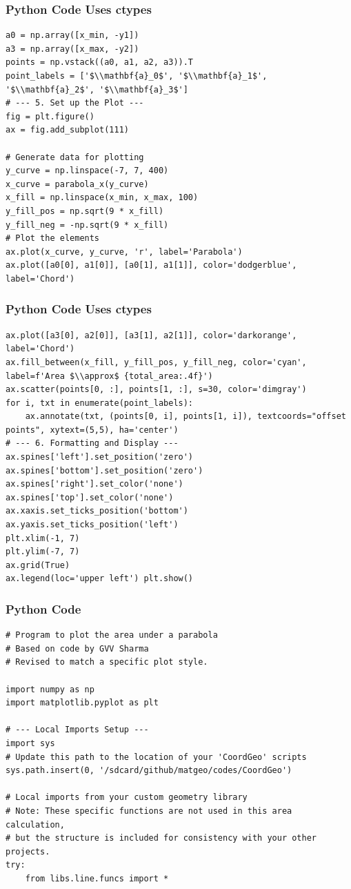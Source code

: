 \documentclass{beamer}
\begin{document}
\begin{frame}[fragile]
\frametitle{Python Code Uses ctypes}
\begin{lstlisting}
a0 = np.array([x_min, -y1])
a3 = np.array([x_max, -y2])
points = np.vstack((a0, a1, a2, a3)).T
point_labels = ['$\\mathbf{a}_0$', '$\\mathbf{a}_1$', '$\\mathbf{a}_2$', '$\\mathbf{a}_3$']
# --- 5. Set up the Plot ---
fig = plt.figure()
ax = fig.add_subplot(111)

# Generate data for plotting
y_curve = np.linspace(-7, 7, 400)
x_curve = parabola_x(y_curve)
x_fill = np.linspace(x_min, x_max, 100)
y_fill_pos = np.sqrt(9 * x_fill)
y_fill_neg = -np.sqrt(9 * x_fill)
# Plot the elements
ax.plot(x_curve, y_curve, 'r', label='Parabola')
ax.plot([a0[0], a1[0]], [a0[1], a1[1]], color='dodgerblue', label='Chord')
 \end{lstlisting}
 \end{frame}
\begin{frame}[fragile]
\frametitle{Python Code Uses ctypes}
\begin{lstlisting}
ax.plot([a3[0], a2[0]], [a3[1], a2[1]], color='darkorange', label='Chord')
ax.fill_between(x_fill, y_fill_pos, y_fill_neg, color='cyan', label=f'Area $\\approx$ {total_area:.4f}')
ax.scatter(points[0, :], points[1, :], s=30, color='dimgray')
for i, txt in enumerate(point_labels):
    ax.annotate(txt, (points[0, i], points[1, i]), textcoords="offset points", xytext=(5,5), ha='center')
# --- 6. Formatting and Display ---
ax.spines['left'].set_position('zero')
ax.spines['bottom'].set_position('zero')
ax.spines['right'].set_color('none')
ax.spines['top'].set_color('none')
ax.xaxis.set_ticks_position('bottom')
ax.yaxis.set_ticks_position('left')
plt.xlim(-1, 7)
plt.ylim(-7, 7)
ax.grid(True)
ax.legend(loc='upper left') plt.show()
 \end{lstlisting}
 \end{frame}
\begin{frame}[fragile]
\frametitle{Python Code}
\begin{lstlisting}
# Program to plot the area under a parabola
# Based on code by GVV Sharma
# Revised to match a specific plot style.

import numpy as np
import matplotlib.pyplot as plt

# --- Local Imports Setup ---
import sys
# Update this path to the location of your 'CoordGeo' scripts
sys.path.insert(0, '/sdcard/github/matgeo/codes/CoordGeo')

# Local imports from your custom geometry library
# Note: These specific functions are not used in this area calculation,
# but the structure is included for consistency with your other projects.
try:
    from libs.line.funcs import *
     \end{lstlisting}
 \end{frame}
\end{document}
